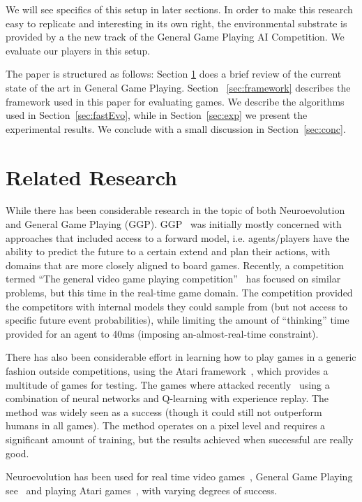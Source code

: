 \documentclass[conference]{IEEEtran}
\begin{document}
We will see specifics of this setup in later sections. In order to make this research easy to replicate and interesting in its own right, the environmental substrate is provided by a the new track of the General Game Playing AI Competition. We evaluate our players in this setup. 

The paper is structured as follows: Section \ref{sec:lit} does a brief review of the current state of the art in General Game Playing. Section ~\ref{sec:framework} describes the framework used in this paper for evaluating games. We describe the algorithms used in Section~\ref{sec:fastEvo}, while in Section~\ref{sec:exp} we present the experimental results. We conclude with a small discussion in Section~\ref{sec:conc}. 
 
\section{Related Research} \label{sec:lit}
While there has been considerable research in the topic of both Neuroevolution and General Game Playing (GGP). GGP~\cite{genesereth2005general} was initially mostly concerned with approaches that included access to a forward model, i.e. agents/players have the ability to predict the future to a certain extend and plan their actions, with domains that are more closely aligned to board games. Recently, a competition termed ``The general video game playing competition''~\cite{Perez2015} has focused on similar problems, but this time in the real-time game domain. The competition provided the competitors with internal models they could sample from (but not access to specific future event probabilities), while limiting the amount of ``thinking'' time provided for an agent to 40ms (imposing an-almost-real-time constraint). 

There has also been considerable effort in learning how to play games in a generic fashion outside competitions,  using the Atari framework~\cite{13jair}, which provides a multitude of games for testing. The games where attacked recently~\cite{mnih2015human} using a combination of neural networks and Q-learning with experience replay. The method was widely seen as a success (though it could still not outperform humans in all games). The method operates on a pixel level and requires a significant amount of training, but the results achieved when successful are really good. 

Neuroevolution has been used for real time video games~\cite{stanley2005real},  General Game Playing see~\cite{reisinger2007coevolving} and playing Atari games~\cite{hausknecht2012hyperneat}, with varying degrees of success.
\end{document}
